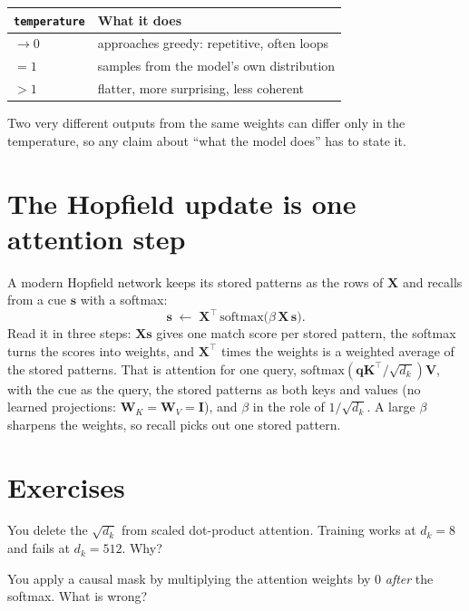 \documentclass[11pt]{article}
\begin{document}
\begin{center}
\begin{tabular}{@{}ll@{}}
\toprule
\texttt{temperature} & What it does \\
\midrule
$\to 0$ & approaches greedy: repetitive, often loops \\
$= 1$ & samples from the model's own distribution \\
$> 1$ & flatter, more surprising, less coherent \\
\bottomrule
\end{tabular}
\end{center}

\begin{keybox}
 Two very different outputs from the
same weights can differ only in the temperature, so any claim about ``what the
model does'' has to state it.
\end{keybox}

\section{The Hopfield update is one attention step}

A modern Hopfield network keeps its stored patterns as the rows of
$\boldsymbol{X}$ and recalls from a cue $\boldsymbol{s}$ with a softmax:
\[
\boldsymbol{s}\;\leftarrow\;\boldsymbol{X}^{\top}\,\mathrm{softmax}\big(\beta\,\boldsymbol{X}\,\boldsymbol{s}\big).
\]
Read it in three steps: $\boldsymbol{X}\boldsymbol{s}$ gives one match score per
stored pattern, the softmax turns the scores into weights, and
$\boldsymbol{X}^{\top}$ times the weights is a weighted average of the stored
patterns. That is attention for one query,
$\mathrm{softmax}(\boldsymbol{q}\boldsymbol{K}^{\!\top}/\sqrt{d_k})\boldsymbol{V}$,
with the cue as the query, the stored patterns as both keys and values (no
learned projections: $\boldsymbol{W}_K=\boldsymbol{W}_V=\boldsymbol{I}$), and
$\beta$ in the role of $1/\sqrt{d_k}$. A large $\beta$ sharpens the weights, so
recall picks out one stored pattern.

\section{Exercises}

 You delete the $\sqrt{d_k}$ from scaled dot-product attention. Training
works at $d_k = 8$ and fails at $d_k = 512$. Why?

 You apply a causal mask by multiplying the attention weights by 0
\emph{after} the softmax. What is wrong?
\end{document}
